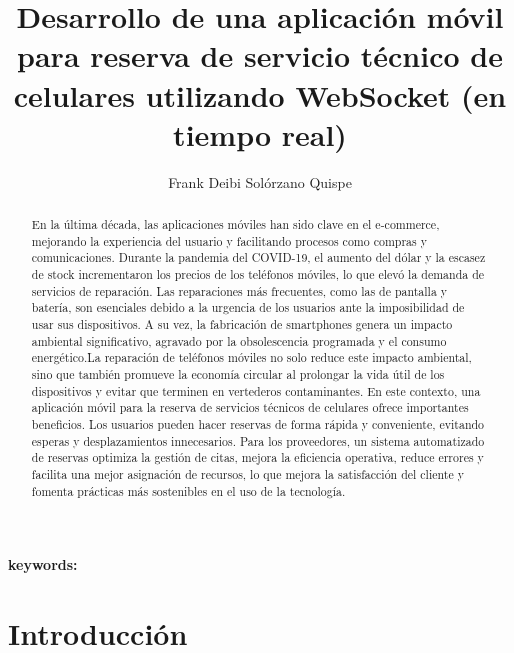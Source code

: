 \documentclass[]{article}
\title{
	\textbf{ Desarrollo de una aplicación móvil para reserva de servicio técnico de celulares utilizando WebSocket (en tiempo real) }
	  }
\author{ Frank Deibi Solórzano Quispe  }
\begin{document}
\maketitle

\begin{abstract}
	En la última década, las aplicaciones móviles han sido clave en el e-commerce, mejorando la experiencia del usuario y facilitando procesos como compras y comunicaciones. Durante la pandemia del COVID-19, el aumento del dólar y la escasez de stock incrementaron los precios de los teléfonos móviles, lo que elevó la demanda de servicios de reparación. Las reparaciones más frecuentes, como las de pantalla y batería, son esenciales debido a la urgencia de los usuarios ante la imposibilidad de usar sus dispositivos. A su vez, la fabricación de smartphones genera un impacto ambiental significativo, agravado por la obsolescencia programada y el consumo energético.La reparación de teléfonos móviles no solo reduce este impacto ambiental, sino que también promueve la economía circular al prolongar la vida útil de los dispositivos y evitar que terminen en vertederos contaminantes. En este contexto, una aplicación móvil para la reserva de servicios técnicos de celulares ofrece importantes beneficios. Los usuarios pueden hacer reservas de forma rápida y conveniente, evitando esperas y desplazamientos innecesarios. Para los proveedores, un sistema automatizado de reservas optimiza la gestión de citas, mejora la eficiencia operativa, reduce errores y facilita una mejor asignación de recursos, lo que mejora la satisfacción del cliente y fomenta prácticas más sostenibles en el uso de la tecnología.
\end{abstract}

\textbf{keywords:}

\section{Introducción}
\end{document}
